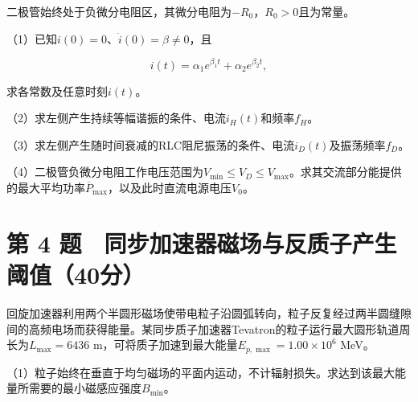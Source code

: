 \documentclass[12pt,a4paper,fontset=fandol]{ctexart}
\begin{document}
二极管始终处于负微分电阻区，其微分电阻为\(-R_0\)，\(R_0>0\)且为常量。

（1）已知\(i(0)=0\)、\(\dot i(0)=\beta\neq0\)，且

\[
i(t)=\alpha_1e^{\beta_1t}+\alpha_2e^{\beta_2t},
\]

求各常数及任意时刻\(i(t)\)。

（2）求左侧产生持续等幅谐振的条件、电流\(i_H(t)\)和频率\(f_H\)。

（3）求左侧产生随时间衰减的RLC阻尼振荡的条件、电流\(i_D(t)\)及振荡频率\(f_D\)。

（4）二极管负微分电阻工作电压范围为\(V_{\min}\leq V_D\leq V_{\max}\)。求其交流部分能提供的最大平均功率\(\overline P_{\max}\)，以及此时直流电源电压\(V_0\)。

\clearpage

\section{第 4
题　同步加速器磁场与反质子产生阈值（40分）}\label{ux7b2c-4-ux9898-ux540cux6b65ux52a0ux901fux5668ux78c1ux573aux4e0eux53cdux8d28ux5b50ux4ea7ux751fux9608ux503c40ux5206}

回旋加速器利用两个半圆形磁场使带电粒子沿圆弧转向，粒子反复经过两半圆缝隙间的高频电场而获得能量。某同步质子加速器Tevatron的粒子运行最大圆形轨道周长为\(L_{\max}=6436\)
m，可将质子加速到最大能量\(E_{p,\max}=1.00\times10^6\) MeV。

（1）粒子始终在垂直于均匀磁场的平面内运动，不计辐射损失。求达到该最大能量所需要的最小磁感应强度\(B_{\min}\)。

\begin{center}
\begin{minipage}{\linewidth}
\centering\begingroup{}
\ifdim\wd\diagrambox>.88\linewidth
\sbox{\diagrambox}{\resizebox{.88\linewidth}{!}{\usebox{\diagrambox}}}\fi
\ifdim\ht\diagrambox>.20\textheight
\resizebox{!}{.20\textheight}{\usebox{\diagrambox}}
\else\usebox{\diagrambox}\fi
\par{}\endgroup\end{minipage}\end{center}
\end{document}
